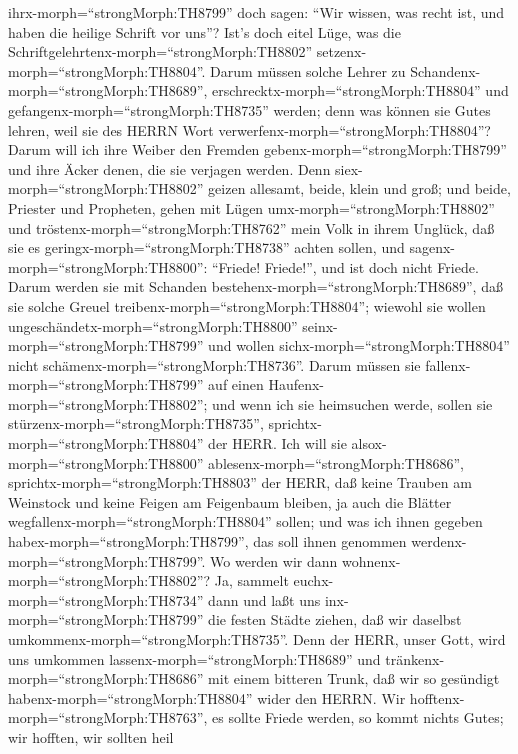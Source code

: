 ihrx-morph=``strongMorph:TH8799'' doch sagen: ``Wir wissen, was recht
ist, und haben die heilige Schrift vor uns''? Ist's doch eitel Lüge, was
die Schriftgelehrtenx-morph=``strongMorph:TH8802''
setzenx-morph=``strongMorph:TH8804''.  Darum müssen solche
Lehrer zu Schandenx-morph=``strongMorph:TH8689'',
erschrecktx-morph=``strongMorph:TH8804'' und
gefangenx-morph=``strongMorph:TH8735'' werden; denn was können sie Gutes
lehren, weil sie des HERRN Wort verwerfenx-morph=``strongMorph:TH8804''?
 Darum will ich ihre Weiber den Fremden
gebenx-morph=``strongMorph:TH8799'' und ihre Äcker denen, die sie
verjagen werden. Denn siex-morph=``strongMorph:TH8802'' geizen allesamt,
beide, klein und groß; und beide, Priester und Propheten, gehen mit
Lügen umx-morph=``strongMorph:TH8802''  und
tröstenx-morph=``strongMorph:TH8762'' mein Volk in ihrem Unglück, daß
sie es geringx-morph=``strongMorph:TH8738'' achten sollen, und
sagenx-morph=``strongMorph:TH8800'': ``Friede! Friede!'', und ist doch
nicht Friede.  Darum werden sie mit Schanden
bestehenx-morph=``strongMorph:TH8689'', daß sie solche Greuel
treibenx-morph=``strongMorph:TH8804''; wiewohl sie wollen
ungeschändetx-morph=``strongMorph:TH8800''
seinx-morph=``strongMorph:TH8799'' und wollen
sichx-morph=``strongMorph:TH8804'' nicht
schämenx-morph=``strongMorph:TH8736''. Darum müssen sie
fallenx-morph=``strongMorph:TH8799'' auf einen
Haufenx-morph=``strongMorph:TH8802''; und wenn ich sie heimsuchen werde,
sollen sie stürzenx-morph=``strongMorph:TH8735'',
sprichtx-morph=``strongMorph:TH8804'' der HERR.  Ich will
sie alsox-morph=``strongMorph:TH8800''
ablesenx-morph=``strongMorph:TH8686'',
sprichtx-morph=``strongMorph:TH8803'' der HERR, daß keine Trauben am
Weinstock und keine Feigen am Feigenbaum bleiben, ja auch die Blätter
wegfallenx-morph=``strongMorph:TH8804'' sollen; und was ich ihnen
gegeben habex-morph=``strongMorph:TH8799'', das soll ihnen genommen
werdenx-morph=``strongMorph:TH8799''.  Wo werden wir dann
wohnenx-morph=``strongMorph:TH8802''? Ja, sammelt
euchx-morph=``strongMorph:TH8734'' dann und laßt uns
inx-morph=``strongMorph:TH8799'' die festen Städte ziehen, daß wir
daselbst umkommenx-morph=``strongMorph:TH8735''. Denn der HERR, unser
Gott, wird uns umkommen lassenx-morph=``strongMorph:TH8689'' und
tränkenx-morph=``strongMorph:TH8686'' mit einem bitteren Trunk, daß wir
so gesündigt habenx-morph=``strongMorph:TH8804'' wider den HERRN.
 Wir hofftenx-morph=``strongMorph:TH8763'', es sollte
Friede werden, so kommt nichts Gutes; wir hofften, wir sollten heil
